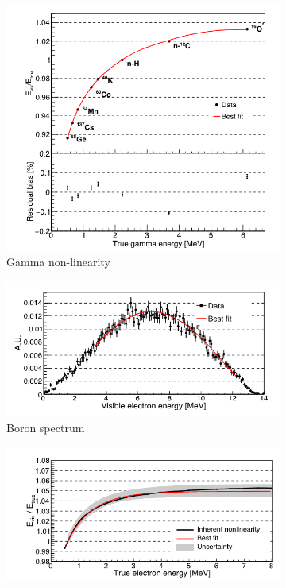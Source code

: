 \documentclass[../main.tex]{subfiles}
\begin{document}
\begin{figure}[ht]
  \centering
  \begin{subfigure}[b]{0.24\textwidth}
    \centering
    \includegraphics[width=\textwidth]{images/juno/gamma_nl.png}
    \caption{Gamma non-linearity}
    \label{fig:juno:nl:gamma}
  \end{subfigure}
  \begin{subfigure}[b]{0.37\textwidth}
    \centering
    \includegraphics[width=\textwidth]{images/juno/boron_nl.png}
    \caption{Boron spectrum}
    \label{fig:juno:nl:boron}
  \end{subfigure}
  \begin{subfigure}[b]{0.37\textwidth}
    \centering
    \includegraphics[width=\textwidth]{images/juno/e-_nl.png}

\end{subfigure}
\end{figure}
\end{document}
